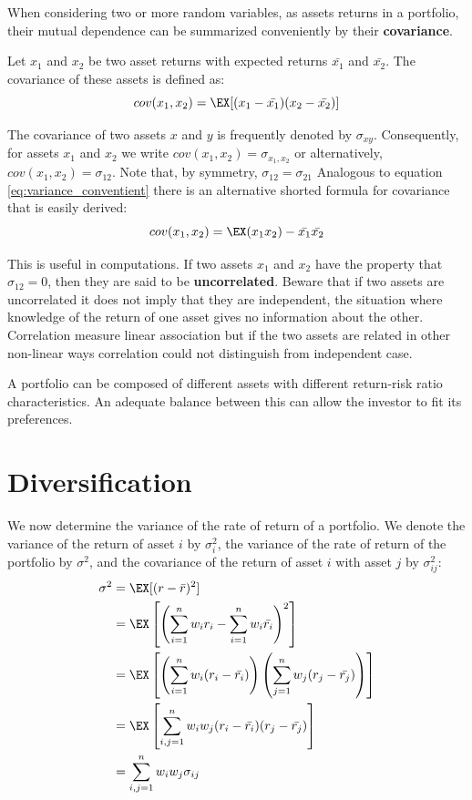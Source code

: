 When considering two or more random variables, as assets returns in a portfolio, their mutual dependence can be summarized conveniently by their \textbf{covariance}.

Let $x_1$ and $x_2$ be two asset returns with expected returns $\bar{x_1}$ and $\bar{x_2}$. The covariance of these assets is defined as:
$$ cov(x_1,x_2) = \EX[(x_1-\bar{x_1})(x_2-\bar{x_2})] $$

The covariance of two assets $x$ and $y$ is frequently denoted by $\sigma_{xy}$.
Consequently, for assets $x_1$ and $x_2$ we write $cov(x_1,x_2)=\sigma_{x_1,x_2}$ or alternatively, $cov(x_1,x_2)=\sigma_{12}$. Note that, by symmetry, $\sigma_{12}=\sigma_{21}$
Analogous to equation \ref{eq:variance_conventient} there is an alternative shorted formula for covariance that is easily derived:
$$cov(x_1,x_2)=\EX(x_1 x_2)-\bar{x_1} \bar{x_2}$$

This is useful in computations.
If two assets $x_1$ and $x_2$ have the property that $\sigma_{12}=0$, then they are said to be \textbf{uncorrelated}. Beware that if two assets are uncorrelated it does not imply that they are independent, the situation where knowledge of the return of one asset gives no information about the other. Correlation measure linear association but if the two assets are related in other non-linear ways correlation could not distinguish from independent case.

A portfolio can be composed of different assets with different return-risk ratio characteristics. An adequate balance between this can allow the investor to fit its preferences.


\section{Diversification}
\label{section:diversification}

We now determine the variance of the rate of return of a portfolio.
We denote the variance of the return of asset $i$ by $\sigma^2_i$, the variance of the rate of return of the portfolio by $\sigma^2$, and the covariance of the return of asset $i$ with asset $j$ by $\sigma^2_{ij}$:
\begin{equation}
    \begin{split}
        \sigma^2 & = \EX[(r - \bar{r})^2] \\
        & = \EX \left[ \left( \sum_{i=1}^n w_i r_i - \sum_{i=1}^n w_i \bar{r_i} \right) ^2 \right] \\
        & = \EX \left[ \left( \sum_{i=1}^n w_i(r_i - \bar{r_i}) \right) \left(\sum_{j=1}^n w_j (r_j - \bar{r_j}) \right) \right] \\
        & = \EX \left[ \sum_{i,j=1}^n w_i w_j (r_i - \bar{r_i} ) ( r_j - \bar{r_j}) \right] \\
        & = \sum_{i,j=1}^n w_i w_j \sigma_{ij}
    \end{split}
\end{equation}

